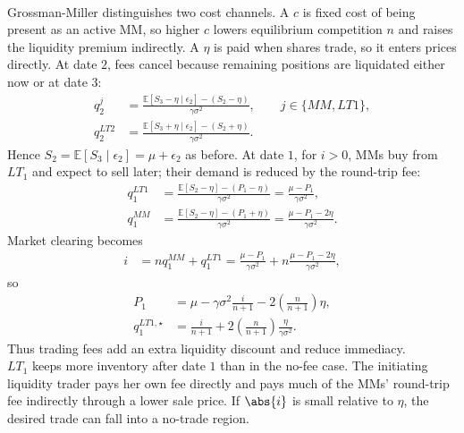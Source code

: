 \begin{model}
\par\smallskip\noindent{}\\
Grossman-Miller distinguishes two cost channels. A  $c$ is fixed cost of being present as an active MM, so higher $c$ lowers equilibrium competition $n$ and raises the liquidity premium indirectly. A  $\eta$ is paid when shares trade, so it enters prices directly. At date $2$, fees cancel because remaining positions are liquidated either now or at date $3$:
\begin{align*}
q_2^j
&=\frac{\mathbb{E}[S_3-\eta\mid\epsilon_2]-(S_2-\eta)}{\gamma\sigma^2},
\qquad j\in\{MM,LT1\},\\
q_2^{LT2}
&=\frac{\mathbb{E}[S_3+\eta\mid\epsilon_2]-(S_2+\eta)}{\gamma\sigma^2}.
\end{align*}
Hence $S_2=\mathbb{E}[S_3\mid\epsilon_2]=\mu+\epsilon_2$ as before. At date $1$, for $i>0$, MMs buy from $LT_1$ and expect to sell later; their demand is reduced by the round-trip fee:
\begin{align*}
q_1^{LT1}
&=\frac{\mathbb{E}[S_2-\eta]-(P_1-\eta)}{\gamma\sigma^2}
=\frac{\mu-P_1}{\gamma\sigma^2},\\
q_1^{MM}
&=\frac{\mathbb{E}[S_2-\eta]-(P_1+\eta)}{\gamma\sigma^2}
=\frac{\mu-P_1-2\eta}{\gamma\sigma^2}.
\end{align*}
Market clearing becomes
\begin{align*}
i&=nq_1^{MM}+q_1^{LT1}
=\frac{\mu-P_1}{\gamma\sigma^2}
+n\frac{\mu-P_1-2\eta}{\gamma\sigma^2},
\end{align*}
so
\begin{align*}
P_1&=\mu-\gamma\sigma^2\frac{i}{n+1}-2\left(\frac{n}{n+1}\right)\eta,\\
q_1^{LT1,\star}
&=\frac{i}{n+1}+2\left(\frac{n}{n+1}\right)\frac{\eta}{\gamma\sigma^2}.
\end{align*}
Thus trading fees add an extra liquidity discount and reduce immediacy.\\
$LT_1$ keeps more inventory after date $1$ than in the no-fee case. The initiating liquidity trader pays her own fee directly and pays much of the MMs' round-trip fee indirectly through a lower sale price. If $\abs{i}$ is small relative to $\eta$, the desired trade can fall into a no-trade region.


\end{model}
